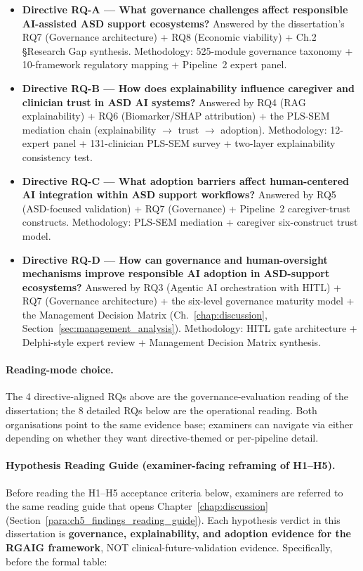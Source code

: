 \begin{itemize}[leftmargin=*, itemsep=3pt]
    \item \textbf{Directive RQ-A — What governance challenges affect responsible AI-assisted ASD support ecosystems?} Answered by the dissertation's RQ7 (Governance architecture) + RQ8 (Economic viability) + Ch.2 §Research Gap synthesis. Methodology: 525-module governance taxonomy + 10-framework regulatory mapping + Pipeline~2 expert panel.
    \item \textbf{Directive RQ-B — How does explainability influence caregiver and clinician trust in ASD AI systems?} Answered by RQ4 (RAG explainability) + RQ6 (Biomarker/SHAP attribution) + the PLS-SEM mediation chain (explainability $\to$ trust $\to$ adoption). Methodology: 12-expert panel + 131-clinician PLS-SEM survey + two-layer explainability consistency test.
    \item \textbf{Directive RQ-C — What adoption barriers affect human-centered AI integration within ASD support workflows?} Answered by RQ5 (ASD-focused validation) + RQ7 (Governance) + Pipeline~2 caregiver-trust constructs. Methodology: PLS-SEM mediation + caregiver six-construct trust model.
    \item \textbf{Directive RQ-D — How can governance and human-oversight mechanisms improve responsible AI adoption in ASD-support ecosystems?} Answered by RQ3 (Agentic AI orchestration with HITL) + RQ7 (Governance architecture) + the six-level governance maturity model + the Management Decision Matrix (Ch.~\ref{chap:discussion}, Section~\ref{sec:management_analysis}). Methodology: HITL gate architecture + Delphi-style expert review + Management Decision Matrix synthesis.
\end{itemize}

\paragraph{Reading-mode choice.} The 4 directive-aligned RQs above are the governance-evaluation reading of the dissertation; the 8 detailed RQs below are the operational reading. Both organisations point to the same evidence base; examiners can navigate via either depending on whether they want directive-themed or per-pipeline detail.

\paragraph{Hypothesis Reading Guide (examiner-facing reframing of H1--H5).}
\label{para:hypothesis_reading_guide_ch1}
Before reading the H1--H5 acceptance criteria below, examiners are referred to the same reading guide that opens Chapter~\ref{chap:discussion} (Section~\ref{para:ch5_findings_reading_guide}). Each hypothesis verdict in this dissertation is \textbf{governance, explainability, and adoption evidence for the RGAIG framework}, NOT clinical-future-validation evidence. Specifically, before the formal table:

